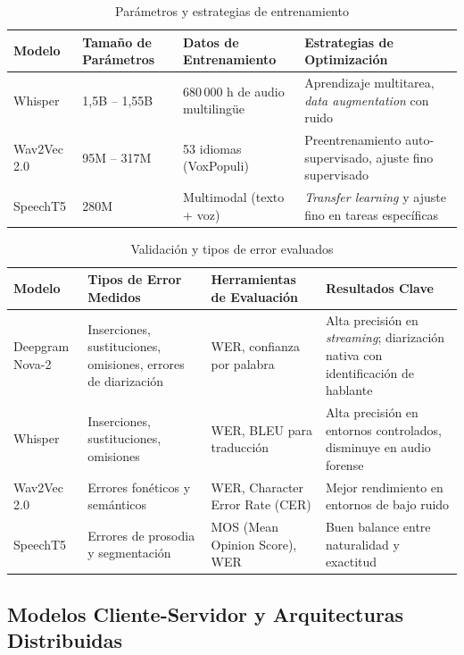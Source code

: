 \documentclass[12pt,a4paper,oneside]{report}
\begin{document}
\begin{table}[H]
\centering
\caption{Parámetros y estrategias de entrenamiento}
\begin{tabular}{|p{2.5cm}|p{3cm}|p{3.5cm}|p{3.5cm}|}
\hline
\rowcolor{gray!20}
\textbf{Modelo} & \textbf{Tamaño de Parámetros} & \textbf{Datos de Entrenamiento} & \textbf{Estrategias de Optimización} \\
\hline
Whisper & 1,5B -- 1,55B & 680\,000 h de audio multilingüe & Aprendizaje multitarea, \textit{data augmentation} con ruido \\
\hline
Wav2Vec 2.0 & 95M -- 317M & 53 idiomas (VoxPopuli) & Preentrenamiento auto-supervisado, ajuste fino supervisado \\
\hline
SpeechT5 & 280M & Multimodal (texto + voz) & \textit{Transfer learning} y ajuste fino en tareas específicas \\
\hline
\end{tabular}
\label{tab:entrenamiento}
\end{table}

\begin{table}[H]
\centering
\caption{Validación y tipos de error evaluados}
\begin{tabular}{|p{2.5cm}|p{3cm}|p{3.5cm}|p{3.5cm}|}
\hline
\rowcolor{gray!20}
\textbf{Modelo} & \textbf{Tipos de Error Medidos} & \textbf{Herramientas de Evaluación} & \textbf{Resultados Clave} \\
\hline
Deepgram Nova-2 & Inserciones, sustituciones, omisiones, errores de diarización & WER, confianza por palabra & Alta precisión en \textit{streaming}; diarización nativa con identificación de hablante \\
\hline
Whisper & Inserciones, sustituciones, omisiones & WER, BLEU para traducción & Alta precisión en entornos controlados, disminuye en audio forense \\
\hline
Wav2Vec 2.0 & Errores fonéticos y semánticos & WER, Character Error Rate (CER) & Mejor rendimiento en entornos de bajo ruido \\
\hline
SpeechT5 & Errores de prosodia y segmentación & MOS (Mean Opinion Score), WER & Buen balance entre naturalidad y exactitud \\
\hline
\end{tabular}
\label{tab:validacion}
\end{table}

\subsection{Modelos Cliente-Servidor y Arquitecturas Distribuidas}
\end{document}
